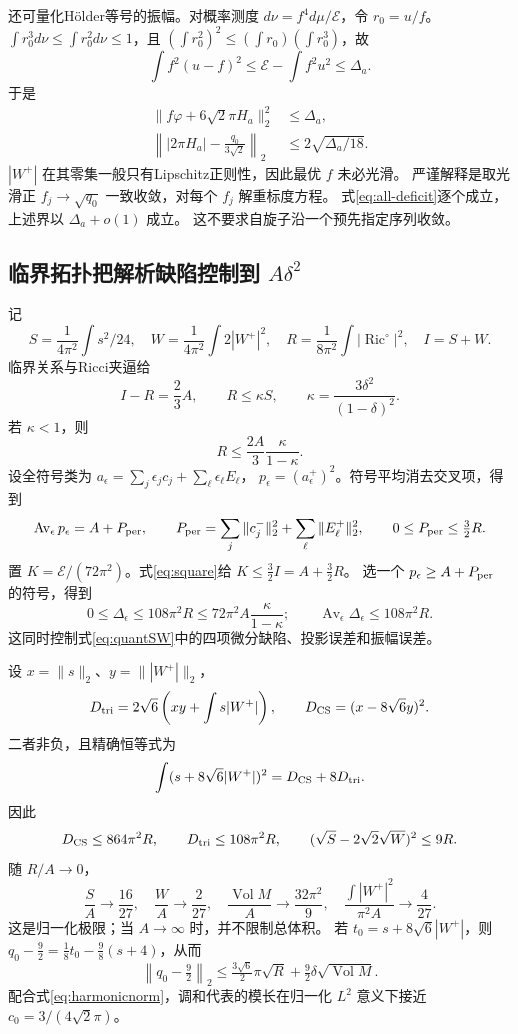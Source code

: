 \documentclass[UTF8,a4paper,11pt,fontset=fandol]{ctexart}
\numberwithin{equation}{section}
\theoremstyle{definition}
\newcommand{\Ric}{\operatorname{Ric}}
\newcommand{\Vol}{\operatorname{Vol}}
\begin{document}
还可量化H\"older等号的振幅。对概率测度
$d\nu=f^4d\mu/\mathcal E$，令 $r_0=u/f$。
$\int r_0^3d\nu\le\int r_0^2d\nu\le1$，且
$(\int r_0^2)^2\le(\int r_0)(\int r_0^3)$，故
\[
\int f^2(u-f)^2\le\mathcal E-\int f^2u^2\le\Delta_a.
\]
于是
\begin{align}
\|f\varphi+6\sqrt2\pi H_a\|_2^2&\le\Delta_a,\label{eq:formprojection}\\
\left\||2\pi H_a|-\frac{q_0}{3\sqrt2}\right\|_2
&\le2\sqrt{\Delta_a/18}.\label{eq:harmonicnorm}
\end{align}
$|W^+|$ 在其零集一般只有Lipschitz正则性，因此最优 $f$ 未必光滑。
严谨解释是取光滑正 $f_j\to\sqrt{q_0}$ 一致收敛，对每个 $f_j$ 解重标度方程。
式\eqref{eq:all-deficit}逐个成立，上述界以 $\Delta_a+o(1)$ 成立。
这不要求自旋子沿一个预先指定序列收敛。

\subsection{临界拓扑把解析缺陷控制到 $A\delta^2$}
记
\[
S=\frac1{4\pi^2}\int s^2/24,\quad
W=\frac1{4\pi^2}\int2|W^+|^2,\quad
R=\frac1{8\pi^2}\int|\Ric^\circ|^2,\quad I=S+W.
\]
临界关系与Ricci夹逼给
\[
I-R=\frac23A,\qquad R\le\kappa S,\qquad
\kappa=\frac{3\delta^2}{(1-\delta)^2}.
\]
若 $\kappa<1$，则
\begin{equation}\label{eq:Rmax}
R\le\frac{2A}{3}\frac{\kappa}{1-\kappa}.
\end{equation}
设全符号类为 $a_\epsilon=\sum_j\epsilon_jc_j+\sum_\ell\epsilon_\ell E_\ell$，
$p_\epsilon=(a_\epsilon^+)^2$。符号平均消去交叉项，得到
\[
\operatorname{Av}_\epsilon p_\epsilon
=A+P_{\rm per},\qquad
P_{\rm per}=\sum_j\|c_j^-\|_2^2+\sum_\ell\|E_\ell^+\|_2^2,\qquad
0\le P_{\rm per}\le\tfrac32R.
\]
置 $K=\mathcal E/(72\pi^2)$。式\eqref{eq:square}给
$K\le\tfrac32I=A+\tfrac32R$。
选一个 $p_\epsilon\ge A+P_{\rm per}$ 的符号，得到
\[
0\le\Delta_\epsilon\le108\pi^2R
\le72\pi^2A\frac{\kappa}{1-\kappa};
\qquad
\operatorname{Av}_\epsilon\Delta_\epsilon\le108\pi^2R.
\]
这同时控制式\eqref{eq:quantSW}中的四项微分缺陷、投影误差和振幅误差。

设 $x=\|s\|_2$、$y=\||W^+|\|_2$，
\[
D_{\rm tri}=2\sqrt6\left(xy+\int s|W^+|\right),\qquad
D_{\rm CS}=(x-8\sqrt6y)^2.
\]
二者非负，且精确恒等式为
\[
\int(s+8\sqrt6|W^+|)^2=D_{\rm CS}+8D_{\rm tri}.
\]
因此
\[
D_{\rm CS}\le864\pi^2R,\qquad D_{\rm tri}\le108\pi^2R,\qquad
(\sqrt S-2\sqrt2\sqrt W)^2\le9R.
\]
随 $R/A\to0$，
\[
\frac SA\to\frac{16}{27},\quad
\frac WA\to\frac{2}{27},\quad
\frac{\Vol M}{A}\to\frac{32\pi^2}{9},\quad
\frac{\int|W^+|^2}{\pi^2A}\to\frac4{27}.
\]
这是归一化极限；当 $A\to\infty$ 时，并不限制总体积。
若 $t_0=s+8\sqrt6|W^+|$，则
$q_0-\tfrac92=\tfrac18t_0-\tfrac98(s+4)$，从而
\[
\left\|q_0-\tfrac92\right\|_2
\le\tfrac{3\sqrt6}{2}\pi\sqrt R
+\tfrac92\delta\sqrt{\Vol M}.
\]
配合式\eqref{eq:harmonicnorm}，调和代表的模长在归一化 $L^2$ 意义下接近
$c_0=3/(4\sqrt2\pi)$。
\end{document}
